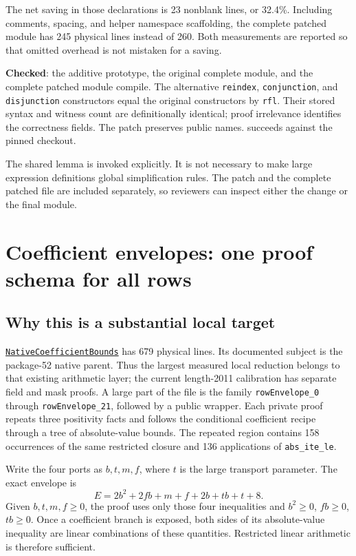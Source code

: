 \documentclass[11pt,letterpaper]{article}
\newcommand{\code}[1]{\nolinkurl{#1}}
\newcommand{\src}[1]{\href{https://github.com/VladimirReshetnikov/ProveIt/blob/60e9c5d620c6c387d932876cfa2d9376f64ea56c/Computability/DiophantineConsistency/Lean/DiophantineConsistency/#1.lean}{\texttt{#1}}}
\newcommand{\checked}{\textbf{Checked}}
\begin{document}
The net saving in those declarations is 23 nonblank lines, or 32.4\%.
Including comments, spacing, and helper namespace scaffolding, the complete
patched module has 245 physical lines instead of 260. Both measurements are
reported so that omitted overhead is not mistaken for a saving.

\checked: the additive prototype, the original complete module, and the
complete patched module compile. The alternative \code{reindex},
\code{conjunction}, and \code{disjunction} constructors equal the original
constructors by \code{rfl}. Their stored syntax and witness count are
definitionally identical; proof irrelevance identifies the correctness fields.
The patch preserves public names. \texttt{} succeeds against
the pinned checkout.

The shared lemma is invoked explicitly. It is not necessary to make large
expression definitions global simplification rules. The patch and the complete
patched file are included separately, so reviewers can inspect either the
change or the final module.

\section{Coefficient envelopes: one proof schema for all rows}

\subsection{Why this is a substantial local target}

\src{NativeCoefficientBounds} has 679 physical lines. Its documented subject
is the package-52 native parent. Thus the largest measured local reduction
belongs to that existing arithmetic layer; the current length-2011 calibration
has separate field and mask proofs. A large part of the file
is the family \code{rowEnvelope_0} through \code{rowEnvelope_21}, followed by a
public wrapper. Each private proof repeats three positivity facts and follows
the conditional coefficient recipe through a tree of absolute-value bounds.
The repeated region contains 158 occurrences of the same restricted
\texttt{} closure and 136 applications of \code{abs_ite_le}.

Write the four ports as $b,t,m,f$, where $t$ is the large transport parameter.
The exact envelope is
\[
 E=2b^2+2fb+m+f+2b+tb+t+8.
\]
Given $b,t,m,f\geq0$, the proof uses only those four inequalities and
$b^2\geq0$, $fb\geq0$, $tb\geq0$. Once a coefficient branch is exposed, both
sides of its absolute-value inequality are linear combinations of these
quantities. Restricted linear arithmetic is therefore sufficient.
\end{document}
